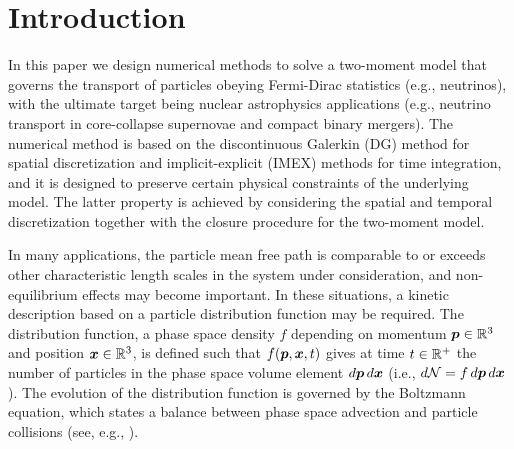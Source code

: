 \section{Introduction}
\label{sec:intro}

In this paper we design numerical methods to solve a two-moment model that governs the transport of particles obeying Fermi-Dirac statistics (e.g., neutrinos), with the ultimate target being nuclear astrophysics applications (e.g., neutrino transport in core-collapse supernovae and compact binary mergers).  
The numerical method is based on the discontinuous Galerkin (DG) method for spatial discretization and implicit-explicit (IMEX) methods for time integration, and it is designed to preserve certain physical constraints of the underlying model.  
The latter property is achieved by considering the spatial and temporal discretization together with the closure procedure for the two-moment model.  

In many applications, the particle mean free path is comparable to or exceeds other characteristic length scales in the system under consideration, and non-equilibrium effects may become important.  
In these situations, a kinetic description based on a particle distribution function may be required.  
The distribution function, a phase space density $f$ depending on momentum $\boldsymbol{p}\in\mathbb{R}^{3}$ and position $\boldsymbol{x}\in\mathbb{R}^{3}$, is defined such that $f(\boldsymbol{p},\boldsymbol{x},t)$ gives at time $t\in\mathbb{R}^{+}$ the number of particles in the phase space volume element $d\boldsymbol{p}\,d\boldsymbol{x}$ (i.e., $d\mathcal{N}=f\,d\boldsymbol{p}\,d\boldsymbol{x}$).  
The evolution of the distribution function is governed by the Boltzmann equation, which states a balance between phase space advection and particle collisions (see, e.g., \cite{braginskii_1965,chapmanCowling_1970,lifshitzPitaevskii_1981}).  

